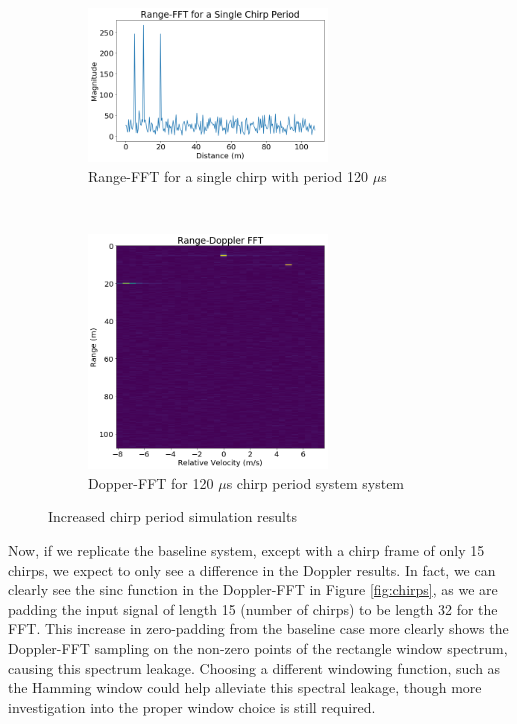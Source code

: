 \begin{figure}[h]
	\centering 
	\begin{subfigure}[c]{0.5\textwidth}
		\centering
		\includegraphics[width=2.5in]{imgs/long_period_range}
		\caption{Range-FFT for a single chirp with period 120 $\mu$s}
	\end{subfigure}%
	~
	\begin{subfigure}[c]{0.5\textwidth}
		\centering
		\includegraphics[width=2.5in]{imgs/long_period_doppler}
		\caption{Dopper-FFT for 120 $\mu$s chirp period system
		system}
	\end{subfigure}
	\caption{Increased chirp period simulation results}
	\label{fig:period}
\end{figure}

Now, if we replicate the baseline system, except with a chirp frame of only 15
chirps, we expect to only see a difference in the Doppler results. In fact, we
can clearly see the sinc function in the Doppler-FFT in Figure \ref{fig:chirps}, as we
are padding the input signal of length 15 (number of chirps) to be length 32 for
the FFT. This increase in zero-padding from the baseline case more clearly shows
the Doppler-FFT sampling on the non-zero points of the rectangle window
spectrum, causing this spectrum leakage. Choosing a different windowing
function, such as the Hamming window could help alleviate this spectral leakage,
though more investigation into the proper window choice is still required.

